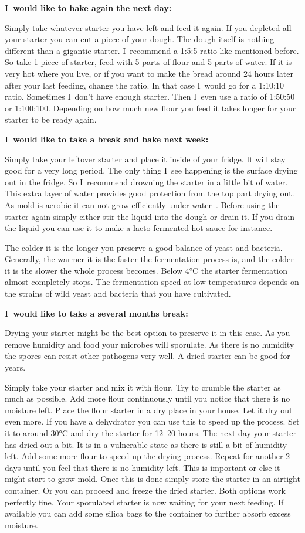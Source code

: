 \textbf{I~would like to bake again the next day:}

Simply take whatever starter you have left and feed it again. If you depleted
all your starter you can cut a piece of your dough. The dough itself is
nothing different than a gigantic starter. I~recommend a 1:5:5 ratio like
mentioned before. So take 1 piece of starter, feed with 5 parts of flour and 5
parts of water. If it is very hot where you live, or if you want to make the
bread around 24 hours later after your last feeding, change the ratio. In that
case I~would go for a 1:10:10 ratio. Sometimes I~don't have enough starter.
Then I~even use a ratio of 1:50:50 or 1:100:100. Depending on how much new
flour you feed it takes longer for your starter to be ready again.

\textbf{I~would like to take a break and bake next week:}

Simply take your leftover starter and place it inside of your fridge. It will stay good
for a very long period. The only thing I~see happening is the surface
drying out in the fridge. So I~recommend drowning the starter in a little bit
of water. This extra layer of water provides good protection from the top
part drying out. As mold is aerobic it can not grow efficiently under
water~\cite{mold+anaerobic}. Before using the starter again simply either stir
the liquid into the dough or drain it. If you drain the liquid you can use it
to make a lacto fermented hot sauce for instance.

The colder it is the longer you preserve a good balance of yeast and
bacteria. Generally, the warmer it is the faster the fermentation process is,
and the colder it is the slower the whole process becomes.
Below 4°C the starter fermentation almost completely stops. The
fermentation speed at low temperatures depends on the
strains of wild yeast and bacteria
that you have cultivated.

\textbf{I~would like to take a several months break:}

Drying your starter might be the best option to preserve it in this case. As
you remove humidity and food your microbes will sporulate. As there is no
humidity the spores can resist other pathogens very well. A dried starter can
be good for years.

Simply take your starter and mix it with flour. Try to crumble the starter as
much as possible. Add more flour continuously until you notice that there is no
moisture left. Place the flour starter in a dry place in your house. Let it
dry out even more. If you have a dehydrator you can use this to speed up the
process. Set it to around 30°C and dry the starter for 12--20 hours. The next
day your starter has dried out a bit. It is in a vulnerable state as there is still a bit
of humidity left. Add some more flour to speed up the drying process. Repeat
for another 2 days until you feel that there is no humidity left. This is
important or else it might start to grow mold. Once this is done simply store the
starter in an airtight container. Or you can proceed and freeze
the dried starter. Both options work perfectly fine. Your sporulated starter
is now waiting for your next feeding. If available you can add some silica
bags to the container to further absorb excess moisture.

